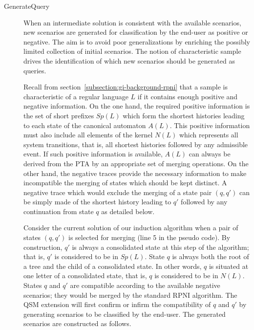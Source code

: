 \begin{description}

\item[GenerateQuery] When an intermediate solution is consistent with the available scenarios, new scenarios are generated for classification by the end-user as positive or negative. The aim is to avoid poor generalizations by enriching the possibly limited collection of initial scenarios. The notion of characteristic sample drives the identification of which new scenarios should be generated as queries. 

Recall from section~\ref{subsection:gi-background-rpni} that a sample is characteristic of a regular language $L$ if it contains enough positive and negative information. On the one hand, the required positive information is the set of short prefixes $Sp(L)$ which form the shortest histories leading to each state of the canonical automaton $A(L)$. This positive information must also include all elements of the kernel $N(L)$ which represents all system transitions, that is, all shortest histories followed by any admissible event. If such positive information is available, $A(L)$ can always be derived from the PTA by an appropriate set of merging operations. On the other hand, the negative traces provide the necessary information to make incompatible the merging of states which should be kept distinct. A negative trace which would exclude the merging of a state pair $(q, q')$ can be simply made of the shortest history leading to $q'$ followed by any continuation from state $q$ as detailed below.

Consider the current solution of our induction algorithm when a pair of states $(q, q')$ is selected for merging (line 5 in the pseudo code). By construction, $q'$ is always a consolidated state at this step of the algorithm; that is, $q'$ is considered to be in $Sp(L)$. State $q$ is always both the root of a tree and the child of a consolidated state. In other words, $q$ is situated at one letter of a consolidated state, that is, $q$ is considered to be in $N(L)$. States $q$ and $q'$ are compatible according to the available negative scenarios; they would be merged by the standard RPNI algorithm. The QSM extension will first confirm or infirm the compatibility of $q$ and $q'$ by generating scenarios to be classified by the end-user. The generated scenarios are constructed as follows.


\end{description}
